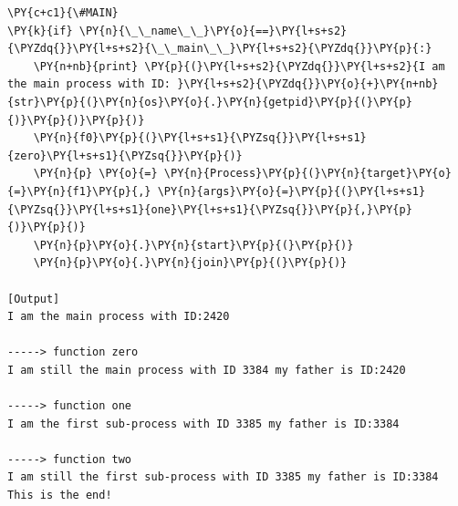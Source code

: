 \begin{Verbatim}[label=\makebox{\url{https://github.com/lucabaldini/cmepda/tree/master/slides/latex/snippets/FatherAndSons.py}},commandchars=\\\{\}]
\PY{c+c1}{\#MAIN}
\PY{k}{if} \PY{n}{\_\_name\_\_}\PY{o}{==}\PY{l+s+s2}{\PYZdq{}}\PY{l+s+s2}{\_\_main\_\_}\PY{l+s+s2}{\PYZdq{}}\PY{p}{:}
    \PY{n+nb}{print} \PY{p}{(}\PY{l+s+s2}{\PYZdq{}}\PY{l+s+s2}{I am the main process with ID: }\PY{l+s+s2}{\PYZdq{}}\PY{o}{+}\PY{n+nb}{str}\PY{p}{(}\PY{n}{os}\PY{o}{.}\PY{n}{getpid}\PY{p}{(}\PY{p}{)}\PY{p}{)}\PY{p}{)}
    \PY{n}{f0}\PY{p}{(}\PY{l+s+s1}{\PYZsq{}}\PY{l+s+s1}{zero}\PY{l+s+s1}{\PYZsq{}}\PY{p}{)}
    \PY{n}{p} \PY{o}{=} \PY{n}{Process}\PY{p}{(}\PY{n}{target}\PY{o}{=}\PY{n}{f1}\PY{p}{,} \PY{n}{args}\PY{o}{=}\PY{p}{(}\PY{l+s+s1}{\PYZsq{}}\PY{l+s+s1}{one}\PY{l+s+s1}{\PYZsq{}}\PY{p}{,}\PY{p}{)}\PY{p}{)}
    \PY{n}{p}\PY{o}{.}\PY{n}{start}\PY{p}{(}\PY{p}{)}
    \PY{n}{p}\PY{o}{.}\PY{n}{join}\PY{p}{(}\PY{p}{)}

[Output]
I am the main process with ID:2420

-----> function zero
I am still the main process with ID 3384 my father is ID:2420

-----> function one
I am the first sub-process with ID 3385 my father is ID:3384

-----> function two
I am still the first sub-process with ID 3385 my father is ID:3384
This is the end!
\end{Verbatim}
